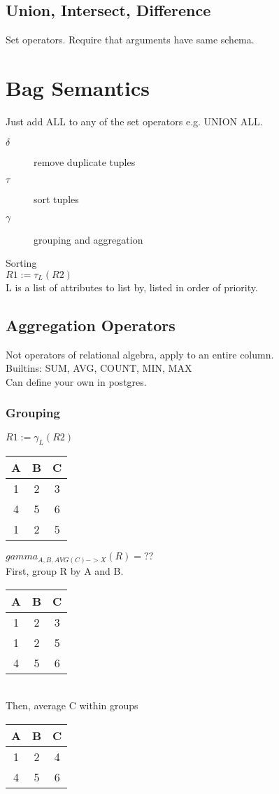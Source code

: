 \documentclass[12pt]{article}
\begin{document}
\subsection{Union, Intersect, Difference}
Set operators. Require that arguments have same schema. 

\section{Bag Semantics}
Just add ALL to any of the set operators e.g. UNION ALL.
\begin{description}
  \item[$\delta$]{remove duplicate tuples}
  \item[$\tau$]{sort tuples}
  \item[$\gamma$]{grouping and aggregation}
\end{description}

Sorting\\
$R1 := \tau_L(R2)$\\
L is a list of attributes to list by, listed in order of priority.

\subsection{Aggregation Operators}
Not operators of relational algebra, apply to an entire column.\\
Builtins: SUM, AVG, COUNT, MIN, MAX\\
Can define your own in postgres.

\subsubsection{Grouping}
$R1 := \gamma_L(R2)$\\
\begin{tabular}{|c|c|c|}
  \hline
  A & B & C\\
  \hline
  1 & 2 & 3\\
  \hline
  4 & 5 & 6\\
  \hline
  1 & 2 & 5\\
  \hline
\end{tabular}
$gamma_{A,B,AVG(C)->X}(R) = ??$\\
First, group R by A and B.\\ 
\begin{tabular}{|c|c|c|}
  \hline
  A & B & C\\
  \hline
  1 & 2 & 3\\
  \hline
  1 & 2 & 5\\
  \hline
  4 & 5 & 6\\
  \hline
\end{tabular}\\
Then, average C within groups\\
\begin{tabular}{|c|c|c|}
  \hline
  A & B & C\\
  \hline
  1 & 2 & 4\\
  \hline
  4 & 5 & 6\\
  \hline
\end{tabular}
\end{document}
